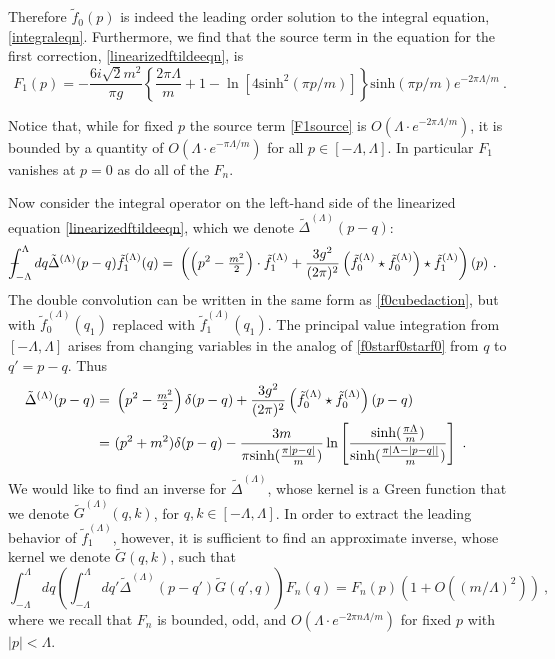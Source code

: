 \def\letter{0}\def\pr{0}\documentclass[a4paper,12pt, epsfig]{article}
\def\Xint#1{\mathchoice
   {\XXint\displaystyle\textstyle{#1}}%
   {\XXint\textstyle\scriptstyle{#1}}%
   {\XXint\scriptstyle\scriptscriptstyle{#1}}%
   {\XXint\scriptscriptstyle\scriptscriptstyle{#1}}%
   \!\int}
\def\XXint#1#2#3{{\setbox0=\hbox{$#1{#2#3}{\int}$}
     \vcenter{\hbox{$#2#3$}}\kern-.5\wd0}}
\def\dashint{\Xint-}
\renewcommand{\sinh}{\textrm{sinh}}
\renewcommand{\(}{\begin{equation}}
\renewcommand{\)}{end{equation} \vspace{-.05in}\linebreak}
\renewcommand{\=}{\hspace{-.03in}=\hspace{-.02in}}
\renewcommand{\(}{\begin{equation}}
\renewcommand{\)}{\end{equation}}
\renewcommand{\(}{\begin{equation}}
\renewcommand{\)}{\end{equation}}
\begin{document}
%
Therefore $\tilde{f}_0(p)$ is indeed the leading order solution to the integral equation, \eqref{integraleqn}.  Furthermore, we find that the source term in the equation for the first correction, \eqref{linearizedftildeeqn}, is
%
\begin{equation}\label{F1source}
F_1(p) = -\frac{6 i \sqrt{2} m^2}{\pi g} \left\{ \frac{2\pi \Lambda}{m} + 1 - \ln [4 \sinh^2(\pi p/m)] \right\} \sinh(\pi p/m) e^{-2\pi \Lambda/m} ~.
\end{equation}
%

Notice that, while for fixed $p$ the source term \eqref{F1source} is $O(\Lambda \cdot e^{-2\pi \Lambda/m})$, it is bounded by a quantity of $O(\Lambda \cdot e^{-\pi \Lambda/m})$ for all $p \in [-\Lambda,\Lambda]$.  In particular $F_1$ vanishes at $p=0$ as do all of the $F_n$.

Now consider the integral operator on the left-hand side of the linearized equation \eqref{linearizedftildeeqn}, which we denote $\tilde{\Delta}^{(\Lambda)}(p-q)$:
%
\begin{align}
\dashint_{-\Lambda}^{\Lambda} dq \tilde{\Delta}^{(\Lambda)}(p-q) \tilde{f}_{1}^{(\Lambda)}(q) =&~  \left( \left( p^2 - \tfrac{m^2}{2} \right) \cdot \tilde{f}_{1}^{(\Lambda)} + \frac{3 g^2}{(2\pi)^2} \left(\tilde{f}_{0}^{(\Lambda)} \star \tilde{f}_{0}^{(\Lambda)}\right) \star \tilde{f}_{1}^{(\Lambda)} \right)(p) ~.
\end{align}
%
The double convolution can be written in the same form as \eqref{f0cubedaction}, but with $\tilde{f}_{0}^{(\Lambda)}(q_1)$ replaced with $\tilde{f}_{1}^{(\Lambda)}(q_1)$.  The principal value integration from $[-\Lambda,\Lambda]$ arises from changing variables in the analog of \eqref{f0starf0starf0} from $q$ to $q' = p-q$.  Thus
%
\begin{align}\label{DeltaL}
\quad \tilde{\Delta}^{(\Lambda)}(p-q) =&~ \left( p^2 - \tfrac{m^2}{2} \right) \delta(p-q) + \frac{3 g^2}{(2\pi)^2} \left(\tilde{f}_{0}^{(\Lambda)} \star \tilde{f}_{0}^{(\Lambda)}\right)(p-q) \cr
=&~ (p^2 + m^2) \delta(p-q) - \frac{3m}{\pi \sinh(\frac{\pi |p-q|}{m})} \ln \left[ \frac{\sinh(\frac{\pi \Lambda}{m})}{\sinh(\frac{\pi |\Lambda - |p-q||}{m})} \right]~ . \qquad
\end{align}
%
We would like to find an inverse for $\tilde{\Delta}^{(\Lambda)}$, whose kernel is a Green function that we denote $\tilde{G}^{(\Lambda)}(q,k)$, for $q,k \in [-\Lambda,\Lambda]$.  In order to extract the leading behavior of $\tilde{f}_{1}^{(\Lambda)}$, however, it is sufficient to find an approximate inverse, whose kernel we denote $\tilde{G}(q,k)$, such that
%
\begin{equation}\label{approxinverse}
\int_{-\Lambda}^{\Lambda} dq \left( \int_{-\Lambda}^{\Lambda} dq' \tilde{\Delta}^{(\Lambda)}(p-q') \tilde{G}(q',q) \right) F_{n}(q) = F_{n}(p) (1 +  O((m/\Lambda)^2) ) ~,
\end{equation}
%
where we recall that $F_n$ is bounded, odd, and $O(\Lambda \cdot e^{-2\pi n \Lambda/m})$ for fixed $p$ with $|p| < \Lambda$.
\end{document}

